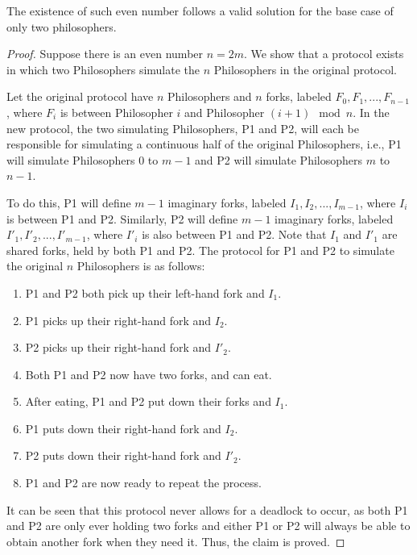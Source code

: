 \documentclass[manuscript,screen,review]{acmart}
\begin{document}
\begin{claim} 
  The existence of such even number follows a valid solution for the base case of only two philosophers.
\end{claim}
\begin{proof}
Suppose there is an even number $n = 2m$. We show that a protocol exists in which two Philosophers simulate the $n$ Philosophers in the original protocol.

Let the original protocol have $n$ Philosophers and $n$ forks, labeled $F_0, F_1, ..., F_{n-1}$, where $F_i$ is between Philosopher $i$ and Philosopher $(i+1) \mod n$. In the new protocol, the two simulating Philosophers, P1 and P2, will each be responsible for simulating a continuous half of the original Philosophers, i.e., P1 will simulate Philosophers $0$ to $m-1$ and P2 will simulate Philosophers $m$ to $n-1$. 

To do this, P1 will define $m-1$ imaginary forks, labeled $I_1, I_2, ..., I_{m-1}$, where $I_i$ is between P1 and P2. Similarly, P2 will define $m-1$ imaginary forks, labeled $I'_1, I'_2, ..., I'_{m-1}$, where $I'_i$ is also between P1 and P2. Note that $I_1$ and $I'_1$ are shared forks, held by both P1 and P2.
The protocol for P1 and P2 to simulate the original $n$ Philosophers is as follows:
\begin{enumerate}
\item P1 and P2 both pick up their left-hand fork and $I_1$.
\item P1 picks up their right-hand fork and $I_2$.
\item P2 picks up their right-hand fork and $I'_2$.
\item Both P1 and P2 now have two forks, and can eat.
\item After eating, P1 and P2 put down their forks and $I_1$.
\item P1 puts down their right-hand fork and $I_2$.
\item P2 puts down their right-hand fork and $I'_2$.
\item P1 and P2 are now ready to repeat the process.
\end{enumerate}
It can be seen that this protocol never allows for a deadlock to occur, as both P1 and P2 are only ever holding two forks and either P1 or P2 will always be able to obtain another fork when they need it. Thus, the claim is proved.

\end{proof}




% 
\printbibliography
\end{document}
